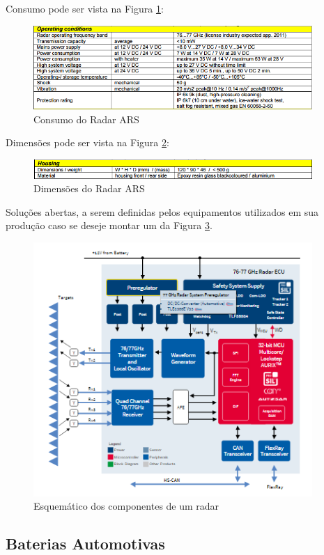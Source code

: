 Consumo pode ser vista na Figura \ref{fig:consumo_radar}:
\begin{figure}[h]
  \centering
  \includegraphics[width=400px, scale=1]{figuras/consumo_radar}
  \caption{Consumo do Radar ARS}
\label{fig:consumo_radar}
\end{figure}

Dimensões pode ser vista na Figura \ref{fig:dimensoes_radar}:
\begin{figure}[h]
  \centering
  \includegraphics[width=400px, scale=1]{figuras/dimensoes_radar}
  \caption{Dimensões do Radar ARS}
\label{fig:dimensoes_radar}
\end{figure}


Soluções abertas, a serem definidas pelos equipamentos utilizados em sua produção caso se deseje montar um da
Figura \ref{fig:esquematico_radar}.
\begin{figure}[h]
  \centering
  \includegraphics[width=400px, scale=1]{figuras/esquematico_radar}
  \caption{Esquemático dos componentes de um radar}
\label{fig:esquematico_radar}
\end{figure}

\subsection{Baterias Automotivas}

